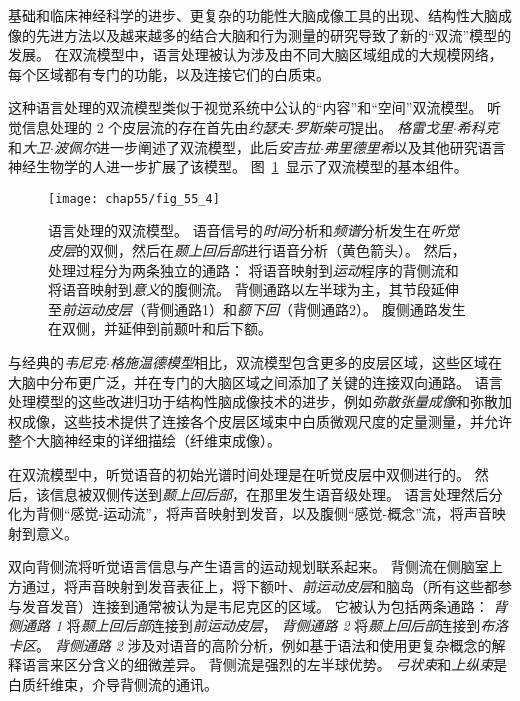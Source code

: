 基础和临床神经科学的进步、更复杂的功能性大脑成像工具的出现、结构性大脑成像的先进方法以及越来越多的结合大脑和行为测量的研究导致了新的“双流”模型的发展。
在双流模型中，语言处理被认为涉及由不同大脑区域组成的大规模网络，每个区域都有专门的功能，以及连接它们的白质束。


这种语言处理的双流模型类似于视觉系统中公认的“内容”和“空间”双流模型。
听觉信息处理的 2 个皮层流的存在首先由\textit{约瑟夫$\cdot$罗斯柴可}提出。
\textit{格雷戈里$\cdot$希科克}和\textit{大卫$\cdot$波佩尔}进一步阐述了双流模型，此后\textit{安吉拉$\cdot$弗里德里希}以及其他研究语言神经生物学的人进一步扩展了该模型。
图~\ref{fig:55_4}~显示了双流模型的基本组件。


\begin{figure}[htbp]
	\centering
	\texttt{[image: chap55/fig\_55\_4]}
	\caption{语言处理的双流模型。
		语音信号的\textit{时间}分析和\textit{频谱}分析发生在\textit{听觉皮层}的双侧，然后在\textit{颞上回后部}进行语音分析（黄色箭头）。
		然后，处理过程分为两条独立的通路：
		将语音映射到\textit{运动}程序的背侧流和将语音映射到\textit{意义}的腹侧流。
		背侧通路以左半球为主，其节段延伸至\textit{前运动皮层}（背侧通路1）和\textit{额下回}（背侧通路2）。
		腹侧通路发生在双侧，并延伸到前颞叶和后下额\cite{hickok2007cortical,skeide2016ontogeny}。}
	\label{fig:55_4}
\end{figure}


与经典的\textit{韦尼克$\cdot$格施温德模型}相比，双流模型包含更多的皮层区域，这些区域在大脑中分布更广泛，并在专门的大脑区域之间添加了关键的连接双向通路。
语言处理模型的这些改进归功于结构性脑成像技术的进步，例如\textit{弥散张量成像}和弥散加权成像，这些技术提供了连接各个皮层区域束中白质微观尺度的定量测量，并允许整个大脑神经束的详细描绘（纤维束成像）。


在双流模型中，听觉语音的初始光谱时间处理是在听觉皮层中双侧进行的。
然后，该信息被双侧传送到\textit{颞上回后部}，在那里发生语音级处理。
语言处理然后分化为背侧“感觉-运动流”，将声音映射到发音，以及腹侧“感觉-概念”流，将声音映射到意义。


双向背侧流将听觉语言信息与产生语言的运动规划联系起来。
背侧流在侧脑室上方通过，将声音映射到发音表征上，将下额叶、\textit{前运动皮层}和脑岛（所有这些都参与发音发音）连接到通常被认为是韦尼克区的区域。
它被认为包括两条通路：
\textit{背侧通路 1} 将\textit{颞上回后部}连接到\textit{前运动皮层}，
\textit{背侧通路 2} 将\textit{颞上回后部}连接到\textit{布洛卡区}。
\textit{背侧通路 2} 涉及对语音的高阶分析，例如基于语法和使用更复杂概念的解释语言来区分含义的细微差异。
背侧流是强烈的左半球优势。
\textit{弓状束}和\textit{上纵束}是白质纤维束，介导背侧流的通讯。


